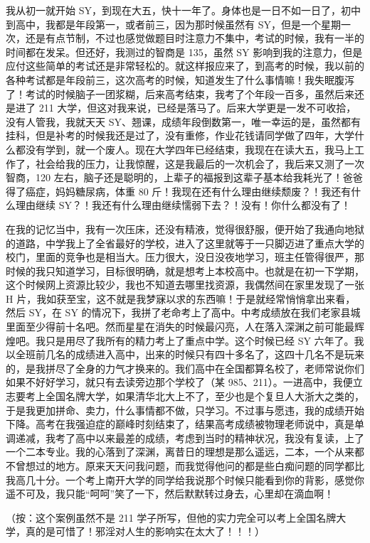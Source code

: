 \begin{case}[211]
    我从初一就开始 SY，到现在大五，快十一年了。身体也是一日不如一日了，初中到高中，我都是年段第一，或者前三，因为那时候虽然有 SY，但是一个星期一次，还是有点节制，不过也感觉做题目时注意力不集中，考试的时候，我有一半的时间都在发呆。但还好，我测过的智商是 135，虽然 SY 影响到我的注意力，但是应付这些简单的考试还是非常轻松的。就这样报应来了，到高考的时候，我以前的各种考试都是年段前三，这次高考的时候，知道发生了什么事情嘛！我失眠腹泻了！考试的时候脑子一团浆糊，后来高考结束，我考了个年段一百多，虽然后来还是进了 211 大学，但这对我来说，已经是落马了。后来大学更是一发不可收拾，没有人管我，我就天天 SY、翘课，成绩年段倒数第一，唯一幸运的是，虽然都有挂科，但是补考的时候我还是过了，没有重修，作业花钱请同学做了四年，大学什么都没有学到，就一个废人。现在大学四年已经结束，我现在在读大五，我马上工作了，社会给我的压力，让我惊醒，这是我最后的一次机会了，我后来又测了一次智商，120 左右，脑子还是聪明的，上辈子的福报到这辈子基本给我耗光了！爸爸得了癌症，妈妈糖尿病，体重 80 斤！我现在还有什么理由继续颓废？！我还有什么理由继续 SY？！我还有什么理由继续懦弱下去？！没有！你什么都没有了！
\end{case}

\begin{case}[211]
    在我的记忆当中，我有一次压床，还没有精液，觉得很舒服，便开始了我通向地狱的道路，中学我上了全省最好的学校，进入了这里就等于一只脚迈进了重点大学的校门，里面的竞争也是相当大。压力很大，没日没夜地学习，班主任管得很严，那时候的我只知道学习，目标很明确，就是想考上本校高中。也就是在初一下学期，这个时候网上资源比较少，我也不知道去哪里找资源，我偶然间在家里发现了一张 H 片，我如获至宝，这不就是我梦寐以求的东西嘛！于是就经常悄悄拿出来看，然后 SY，在 SY 的情况下，我拼了老命考上了高中。中考成绩放在我们老家县城里面至少得前十名吧。然而星星在消失的时候最闪亮，人在落入深渊之前可能最辉煌吧。我只是用尽了我所有的精力考上了重点中学。这个时候已经 SY 六年了。我以全班前几名的成绩进入高中，出来的时候只有四十多名了，这四十几名不是玩来的，是我拼尽了全身的力气才换来的。我们高中在全国都算名校了，老师常说你们如果不好好学习，就只有去读旁边那个学校了（某 985、211）。一进高中，我便立志要考上全国名牌大学，如果清华北大上不了，至少也是个复旦人大浙大之类的，于是我更加拼命、卖力，什么事情都不做，只学习。不过事与愿违，我的成绩开始下降。高考在我强迫症的巅峰时刻结束了，结果高考成绩被物理老师说中，真是单调递减，我考了高中以来最差的成绩，考虑到当时的精神状况，我没有复读，上了一个二本专业。我的心落到了深渊，离昔日的理想是那么遥远，二本，一个从来都不曾想过的地方。原来天天问我问题，而我觉得他问的都是些白痴问题的同学都比我高几十分。一个考上南开大学的同学给我说那个时候只能看到你的背影，感觉你遥不可及，我只能“呵呵”笑了一下，然后默默转过身去，心里却在滴血啊！

    （按：这个案例虽然不是 211 学子所写，但他的实力完全可以考上全国名牌大学，真的是可惜了！邪淫对人生的影响实在太大了！！！）
\end{case}


